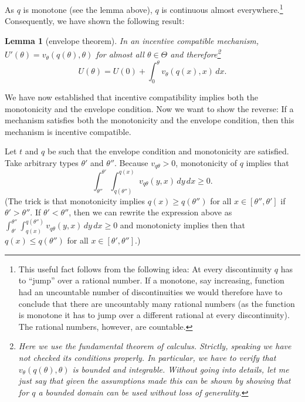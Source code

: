 \documentclass[12pt]{article}
\newtheorem{lemma}{Lemma}
\begin{document}
As $q$ is monotone (see the lemma above), $q$ is continuous almost everywhere.\footnote{This useful fact follows from the following idea: At every discontinuity $q$ has to ``jump'' over a rational number. If a monotone, say increasing, function had an uncountable number of discontinuities we would therefore have to conclude that there are uncountably many rational numbers (as the function is monotone it has to jump over a different rational at every discontinuity). The rational numbers, however, are countable.  } Consequently, we have shown the following result:
\begin{lemma}[envelope theorem]
  In an incentive compatible mechanism, $U'(\theta )=v_\theta (q(\theta ),\theta )$ for almost all $\theta \in\Theta $ and therefore\footnote{Here we use the fundamental theorem of calculus. Strictly, speaking we have not checked its conditions properly. In particular, we have to verify that $v_\theta (q(\theta ),\theta )$ is bounded and integrable. Without going into details, let me just say that given the assumptions made this can be shown by showing that for $q$ a bounded domain can be used without loss of generality.}
  \begin{equation*}
    U(\theta )=U(0)+\int_0^\theta v_\theta (q(x),x)\,dx.
  \end{equation*}
\end{lemma}

We have now established that incentive compatibility implies both the monotonicity and the envelope condition. Now we want to show the reverse: If a mechanism satisfies both the monotonicity and the envelope condition, then this mechanism is incentive compatible.

Let $t$ and $q$ be such that the envelope condition and monotonicity are satisfied. Take arbitrary types $\theta '$ and $\theta ''$. Because $v_{q\theta }>0$, monotonicity of $q$ implies that
\begin{equation}\label{eq:3}
  \int_{\theta ''}^{\theta '}\int_{q(\theta '')}^{q(x)}v_{q\theta }(y,x)\,dy\,dx\geq 0.
\end{equation}
(The trick is that monotonicity implies $q(x)\geq q(\theta '')$ for all $x\in[\theta '',\theta ']$ if $\theta '>\theta ''$. If $\theta '<\theta ''$, then we can rewrite the expression above as $\int_{\theta '}^{\theta ''}\int^{q(\theta '')}_{q(x)}v_{q\theta }(y,x)\,dy\,dx\geq 0$ and monotonicty implies then that $q(x)\leq q(\theta '')$ for all $x\in[\theta ',\theta '']$.) 
\end{document}
